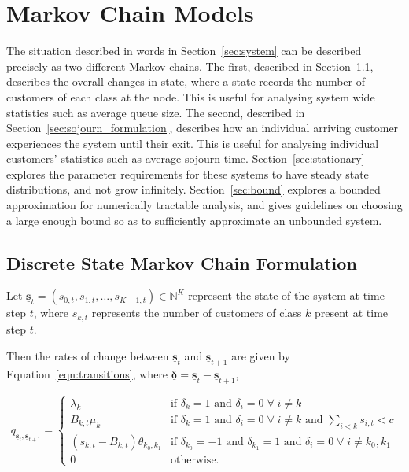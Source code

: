 \documentclass{article}
\begin{document}
\section{Markov Chain Models}
The situation described in words in Section~\ref{sec:system} can be described
precisely as two different Markov chains.
The first, described in Section~\ref{sec:state_formulation}, describes the
overall changes in state, where a state records the number of customers of each
class at the node. This is useful for analysing system wide statistics such as
average queue size.
The second, described in Section~\ref{sec:sojourn_formulation}, describes how an
individual arriving customer experiences the system until their exit. This is
useful for analysing individual customers' statistics such as average sojourn
time.
Section~\ref{sec:stationary} explores the parameter requirements for these
systems to have steady state distributions, and not grow infinitely.
Section~\ref{sec:bound} explores a bounded approximation for numerically
tractable analysis, and gives guidelines on choosing a large enough bound so as
to sufficiently approximate an unbounded system.


\subsection{Discrete State Markov Chain Formulation}\label{sec:state_formulation}
Let
$\underline{\mathbf{s}}_t = (s_{0,t}, s_{1,t}, \dots, s_{K-1,t}) \in \mathbb{N}^K$
represent the state of the system at time step $t$, where $s_{k,t}$ represents
the number of customers of class $k$ present at time step $t$.

Then the rates of change between $\underline{\mathbf{s}}_t$ and
$\underline{\mathbf{s}}_{t+1}$ are given by Equation~\ref{eqn:transitions},
where $\underline{\mathbf{\delta}} = \underline{\mathbf{s}}_t - \underline{\mathbf{s}}_{t+1}$,

\begin{equation}\label{eqn:transitions}
q_{\underline{\mathbf{s}}_t, \underline{\mathbf{s}}_{t+1}} = 
\begin{cases}
\lambda_k & \text{if } \delta_k = 1 \text{ and } \delta_i = 0 \; \forall \; i \neq k \\
B_{k,t} \mu_k & \text{if } \delta_k = 1 \text{ and } \delta_i = 0 \; \forall \; i \neq k \text{ and } \sum_{i < k} s_{i,t} < c \\
(s_{k,t} - B_{k,t}) \theta_{k_0,k_1} & \text{if } \delta_{k_0} = -1 \text{ and } \delta_{k_1} = 1 \text{ and } \delta_i = 0 \; \forall \; i \neq k_0, k_1 \\
0 & \text{otherwise.}
\end{cases}
\end{equation}
\end{document}
